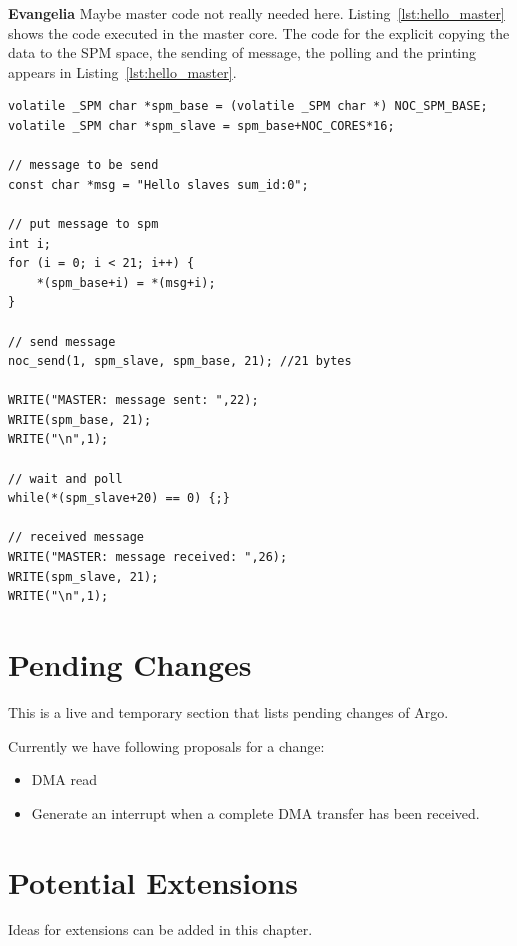 \documentclass[a4paper,fontsize=10pt,twoside,DIV15,BCOR12mm,headinclude=true,footinclude=false,pagesize,bibtotoc]{scrbook}
\newcommand{\comment}[3]{

\textsf{\textbf{#1}} {\color{#3}#2}}
\newcommand{\eva}[1]{\comment{Evangelia}{#1}{Green}}
\begin{document}
\eva{Maybe master code not really needed here.}
Listing~\ref{lst:hello_master} shows the code executed in the master core. The code for the explicit copying the data to the SPM space, the sending of message, the polling and the printing appears in Listing~\ref{lst:hello_master}.

\begin{lstlisting}[float,caption={A 2x2 Hello World application: Master.\label{lst:hello_master}}]
volatile _SPM char *spm_base = (volatile _SPM char *) NOC_SPM_BASE;
volatile _SPM char *spm_slave = spm_base+NOC_CORES*16;

// message to be send
const char *msg = "Hello slaves sum_id:0";

// put message to spm
int i;
for (i = 0; i < 21; i++) {
	*(spm_base+i) = *(msg+i);
}

// send message
noc_send(1, spm_slave, spm_base, 21); //21 bytes

WRITE("MASTER: message sent: ",22);
WRITE(spm_base, 21);
WRITE("\n",1);

// wait and poll
while(*(spm_slave+20) == 0) {;}

// received message
WRITE("MASTER: message received: ",26);
WRITE(spm_slave, 21);
WRITE("\n",1);
\end{lstlisting}

\chapter{Pending Changes}

This is a live and temporary section that lists pending changes of Argo.

Currently we have following proposals for a change:

\begin{itemize}
\item DMA read
\item Generate an interrupt when a complete DMA transfer has been received. 
\end{itemize}

\chapter{Potential Extensions}
\label{chap:ext}
Ideas for extensions can be added in this chapter.





\end{document}
